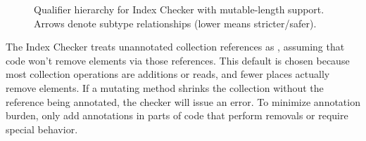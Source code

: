 \begin{figure}
\begin{center}
  \hfill
  \hfill
\end{center}
  \caption{Qualifier hierarchy for Index Checker with mutable-length support.
    Arrows denote subtype relationships (lower means stricter/safer).}
  \label{index-mutability-lattice}
\end{figure}

The Index Checker treats unannotated collection references as ,
assuming that code won't remove elements via those references. This default is chosen because most collection
operations are additions or reads, and fewer places actually remove elements. If a mutating method shrinks
the collection without the reference being annotated, the checker will issue an error. To minimize annotation
burden, only add annotations in parts of code that perform removals or require special behavior.


